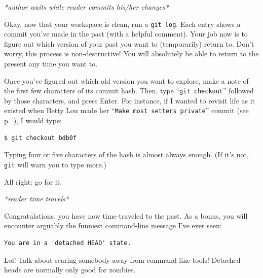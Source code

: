 \vspace{-.1in}
\begin{center}
\textsl{*author waits while reader commits his/her changes*}
\end{center}
\vspace{-.1in}

Okay, now that your workspace is clean, run a \texttt{git log}. Each entry
shows a commit you've made in the past (with a helpful comment). Your job now
is to figure out which version of your past you want to (temporarily) return
to. Don't worry, this process is non-destructive! You will absolutely be able
to return to the present any time you want to.

Once you've figured out which old version you want to explore, make a note of
the first few characters of its commit hash. Then, type ``\texttt{git
checkout}'' followed by those characters, and press Enter. For instance, if I
wanted to revisit life as it existed when Betty Lou made her ``\texttt{Make
most setters private}'' commit (see p.~\pageref{gitLogOutput}), I would type:

\begin{Verbatim}[fontsize=\small,samepage=true,frame=none]
$ git checkout bdb0f
\end{Verbatim}

Typing four or five characters of the hash is almost always enough. (If it's
not, \texttt{git} will warn you to type more.)

All right: go for it.

\vspace{-.1in}
\begin{center}
\textsl{*reader time travels*}
\end{center}
\vspace{-.1in}

Congratulations, you have now time-traveled to the past. As a bonus, you will
encounter arguably the funniest command-line message I've ever seen:


\vspace{-.1in}
\begin{Verbatim}[fontsize=\small,samepage=true,frame=none]
  You are in a 'detached HEAD' state.
\end{Verbatim}
\vspace{-.1in}

Lol! Talk about scaring somebody away from command-line tools! Detached heads
are normally only good for zombies.

